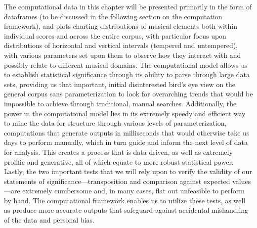 The computational data in this chapter will be presented primarily in
the form of dataframes (to be discussed in the following section on the
computation framework), and plots charting distributions of musical
elements both within individual scores and across the entire corpus,
with particular focus upon distributions of horizontal and vertical
intervals (tempered and untempered), with various parameters set upon
them to observe how they interact with and possibly relate to different
musical domains. The computational model allows us to establish
statistical significance through its ability to parse through large data
sets, providing us that important, initial disinterested bird's eye view
on the general corpus sans parameterization to look for overarching
trends that would be impossible to achieve through traditional, manual
searches. Additionally, the power in the computational model lies in its
extremely speedy and efficient way to mine the data for structure
through various levels of parameterization, computations that generate
outputs in milliseconds that would otherwise take us days to perform
manually, which in turn guide and inform the next level of data for
analysis. This creates a process that is data driven, as well as
extremely prolific and generative, all of which equate to more robust
statistical power. Lastly, the two important tests that we will rely
upon to verify the validity of our statements of
significance---transposition and comparison against expected
values---are extremely cumbersome and, in many cases, flat out
unfeasible to perform by hand. The computational framework enables us to
utilize these tests, as well as produce more accurate outputs that
safeguard against accidental mishandling of the data and personal bias.

